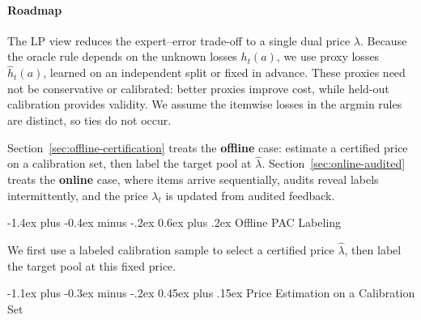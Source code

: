 \documentclass[11pt]{article}
\makeatletter
\renewcommand\section{\@startsection{section}{1}{\z@}%
  {-1.4ex plus -0.4ex minus -.2ex}%
  {0.6ex plus .2ex}%
  {\normalfont\Large\bfseries}}
\renewcommand\subsection{\@startsection{subsection}{2}{\z@}%
  {-1.1ex plus -0.3ex minus -.2ex}%
  {0.45ex plus .15ex}%
  {\normalfont\large\bfseries}}
\newcommand{\hath}{\widehat h}
\makeatother
\begin{document}
\paragraph{Roadmap}
The LP view reduces the expert--error trade-off to a single dual price
\(\lambda\). Because the oracle rule depends on the unknown losses \(h_t(a)\),
we use proxy losses \(\hath_t(a)\), learned on an independent split or fixed in
advance. 
These proxies need not be
conservative or calibrated: better proxies improve cost, while held-out
calibration provides validity. We assume the itemwise losses in the argmin rules
are distinct, so ties do not occur.

Section~\ref{sec:offline-certification} treats the \textbf{offline} case: estimate a
certified price on a calibration set, then label the target pool at
\(\hat\lambda\). 
Section~\ref{sec:online-audited} treats the \textbf{online} case, where
items arrive sequentially, audits reveal labels intermittently, and the price
\(\lambda_t\) is updated from audited feedback.

\section{Offline PAC Labeling}
\label{sec:offline-certification}

We first use a labeled calibration sample to select a certified price
\(\hat\lambda\), then label the target pool at this fixed price.

\subsection{Price Estimation on a Calibration Set}
\label{sec:calibration-selection}
\end{document}
